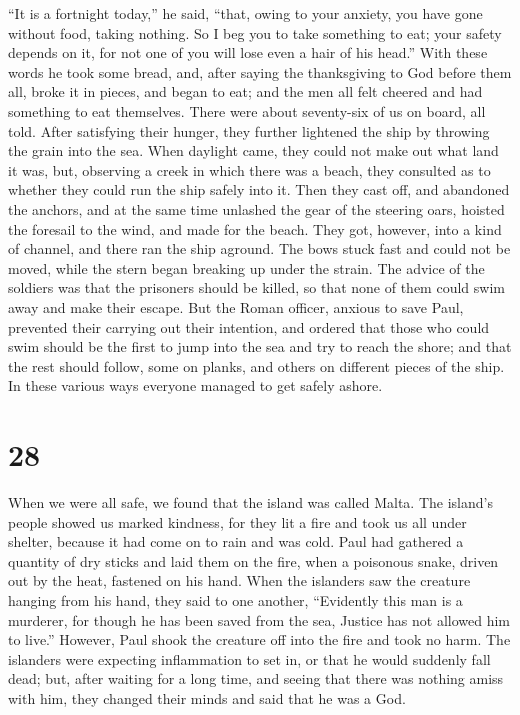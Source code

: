 ``It is a fortnight today,'' he said, ``that, owing to your anxiety, you
have gone without food, taking nothing.  So I beg you to
take something to eat; your safety depends on it, for not one of you
will lose even a hair of his head.''  With these words he
took some bread, and, after saying the thanksgiving to God before them
all, broke it in pieces, and began to eat;  and the men all
felt cheered and had something to eat themselves.  There
were about seventy-six of us on board, all told.  After
satisfying their hunger, they further lightened the ship by throwing the
grain into the sea.  When daylight came, they could not
make out what land it was, but, observing a creek in which there was a
beach, they consulted as to whether they could run the ship safely into
it.  Then they cast off, and abandoned the anchors, and at
the same time unlashed the gear of the steering oars, hoisted the
foresail to the wind, and made for the beach.  They got,
however, into a kind of channel, and there ran the ship aground. The
bows stuck fast and could not be moved, while the stern began breaking
up under the strain.  The advice of the soldiers was that
the prisoners should be killed, so that none of them could swim away and
make their escape.  But the Roman officer, anxious to save
Paul, prevented their carrying out their intention, and ordered that
those who could swim should be the first to jump into the sea and try to
reach the shore;  and that the rest should follow, some on
planks, and others on different pieces of the ship. In these various
ways everyone managed to get safely ashore.

\hypertarget{section-27}{%
\section{28}\label{section-27}}

 When we were all safe, we found that the island was called
Malta.  The island's people showed us marked kindness, for
they lit a fire and took us all under shelter, because it had come on to
rain and was cold.  Paul had gathered a quantity of dry
sticks and laid them on the fire, when a poisonous snake, driven out by
the heat, fastened on his hand.  When the islanders saw the
creature hanging from his hand, they said to one another, ``Evidently
this man is a murderer, for though he has been saved from the sea,
Justice has not allowed him to live.''  However, Paul shook
the creature off into the fire and took no harm.  The
islanders were expecting inflammation to set in, or that he would
suddenly fall dead; but, after waiting for a long time, and seeing that
there was nothing amiss with him, they changed their minds and said that
he was a God.

